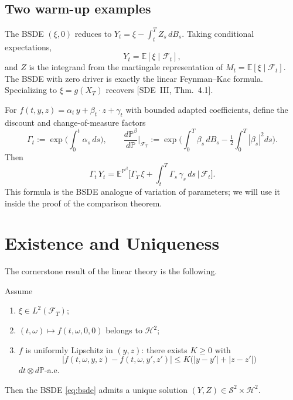 \documentclass{article}
\newcommand{\E}{\mathbb{E}}
\newcommand{\Prob}{\mathbb{P}}
\newcommand{\F}{\mathcal{F}}
\newcommand{\Sc}{\mathcal{S}}
\newcommand{\Hc}{\mathcal{H}}
\begin{document}
\subsection{Two warm-up examples}

\begin{example}
The BSDE $(\xi, 0)$ reduces to $Y_t = \xi - \int_t^T Z_s\,dB_s$. Taking conditional expectations,
\[
  Y_t = \E[\xi \mid \F_t],
\]
and $Z$ is the integrand from the martingale representation of $M_t = \E[\xi \mid \F_t]$. The BSDE with zero driver is exactly the linear Feynman--Kac formula. Specializing to $\xi = g(X_T)$ recovers [SDE~III, Thm.~4.1].
\end{example}

\begin{example}
For $f(t, y, z) = \alpha_t\, y + \beta_t \cdot z + \gamma_t$ with bounded adapted coefficients, define the discount and change-of-measure factors
\[
  \Gamma_t := \exp\!\Big(\int_0^t \alpha_s\, ds\Big), \qquad \frac{d\Prob^\beta}{d\Prob}\bigg|_{\F_T} := \exp\!\Big(\int_0^T \beta_s\, dB_s - \tfrac12\!\int_0^T |\beta_s|^2 ds\Big).
\]
Then
\[
  \Gamma_t\, Y_t = \E^{\Prob^\beta}\!\Big[ \Gamma_T\, \xi + \int_t^T \Gamma_s\, \gamma_s\, ds \,\Big|\, \F_t\Big].
\]
This formula is the BSDE analogue of variation of parameters; we will use it inside the proof of the comparison theorem.
\end{example}

\section{Existence and Uniqueness}

The cornerstone result of the linear theory is the following.

\begin{theorem}\label{thm:pp}
Assume
\begin{enumerate}
  \item[(i)] $\xi \in L^2(\F_T)$;
  \item[(ii)] $(t, \omega) \mapsto f(t, \omega, 0, 0)$ belongs to $\Hc^2$;
  \item[(iii)] $f$ is uniformly Lipschitz in $(y, z)$: there exists $K \ge 0$ with
    \[
      |f(t, \omega, y, z) - f(t, \omega, y', z')| \le K\big(|y - y'| + |z - z'|\big)
    \]
    $dt \otimes d\Prob$-a.e.
\end{enumerate}
Then the BSDE \eqref{eq:bsde} admits a unique solution $(Y, Z) \in \Sc^2 \times \Hc^2$.
\end{theorem}
\end{document}
